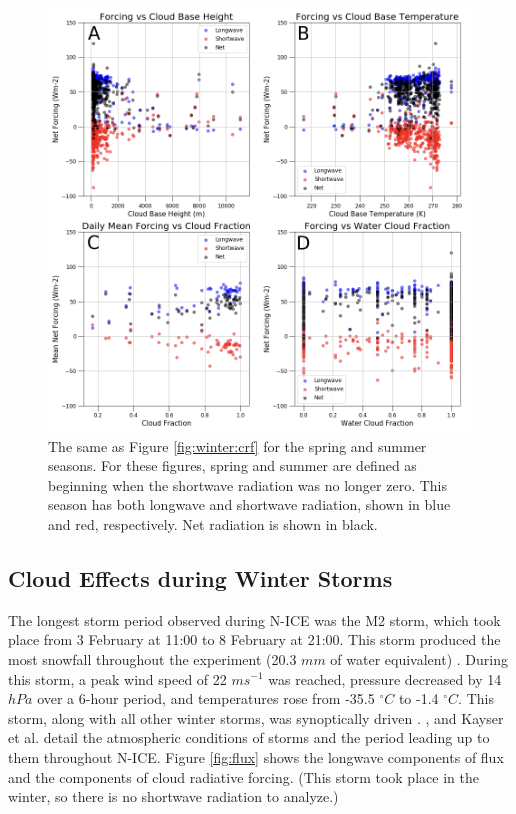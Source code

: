 \begin{figure}[H]
    \centering
    \includegraphics[width=1\linewidth]{figures/chapter4/ch2_f9.png}
    \caption[Spring and summer cloud radiative forcing vs cloud base height, cloud base temperature, cloud fraction, and water cloud fraction]{The same as Figure \ref{fig:winter:crf} for the spring and summer seasons. For these figures, spring and summer are defined as beginning when the shortwave radiation was no longer zero. This season has both longwave and shortwave radiation, shown in blue and red, respectively. Net radiation is shown in black.}
    \label{fig:spring:crf}
\end{figure}

\subsection{Cloud Effects during Winter Storms}

The longest storm period observed during N-ICE was the M2 storm, which took place from 3 February at 11:00 to 8 February at 21:00. This storm produced the most snowfall throughout the experiment (20.3 $mm$ of water equivalent) \citep{cohen:2017}. During this storm, a peak wind speed of 22 $m s^{-1}$ was reached, pressure decreased by 14 $hPa$ over a 6-hour period, and temperatures rose from -35.5 $^{\circ}C$ to -1.4 $^{\circ}C$. This storm, along with all other winter storms, was synoptically driven \citep{cohen:2017}. \citet{cohen:2017, walden:2017}, and Kayser et al. \citep{kayser:2017} detail the atmospheric conditions of storms and the period leading up to them throughout N-ICE. Figure \ref{fig:flux} shows the longwave components of flux and the components of cloud radiative forcing. (This storm took place in the winter, so there is no shortwave radiation to analyze.)

